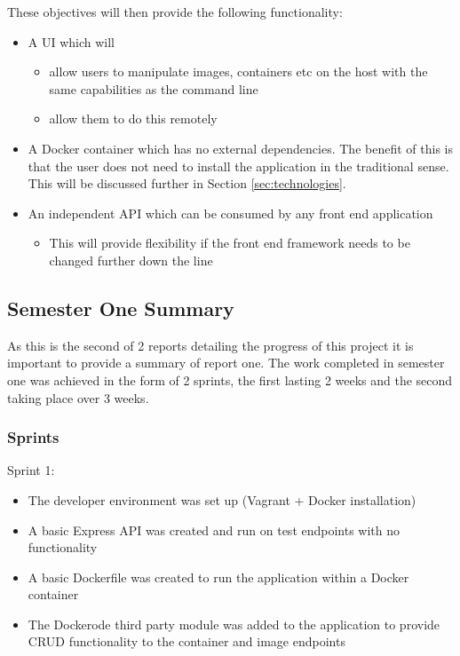 These objectives will then provide the following functionality:

\begin{itemize}
	\item A UI which will 
	\begin{itemize}
		\item allow users to manipulate images, containers etc on the host with the same capabilities as the command line
		\item allow them to do this remotely
	\end{itemize}
	\item A \gls{Docker container} which has no external dependencies. The benefit of this is that the user does not need to install the application in the traditional sense. This will be discussed further in Section \ref{sec:technologies}.
	\item An independent API which can be consumed by any front end application
	\begin{itemize}
		\item This will provide flexibility if the front end framework needs to be changed further down the line
	\end{itemize}
\end{itemize}

\subsection{Semester One Summary}
As this is the second of 2 reports detailing the progress of this project it is important to provide a summary of report one. The work completed in semester one was achieved in the form of 2 \gls{sprint}s, the first lasting 2 weeks and the second taking place over 3 weeks.

\subsubsection{Sprints}
Sprint 1:
\begin{itemize}
	\item The developer environment was set up (Vagrant + Docker installation)
	\item A basic Express \gls{API} was created and run on test endpoints with no functionality
	\item A basic Dockerfile was created to run the application within a Docker container
	\item The Dockerode third party module was added to the application to provide \gls{CRUD} functionality to the container and image endpoints
\end{itemize} 
	
